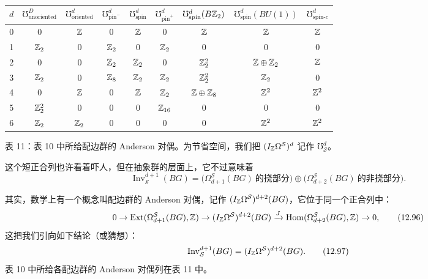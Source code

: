 \begin{center}
  \small
  \setlength{\tabcolsep}{4pt}
  \begin{tabular}{c||cc|ccc|ccc}
    \toprule
    $d$
    & $\mho^D_{\mathrm{unoriented}}$ & $\mho^d_{\mathrm{oriented}}$
    & $\mho^d_{\mathrm{pin}^-}$ & $\mho^d_{\mathrm{spin}}$ & $\mho^d_{\mathrm{pin}^+}$
    & $\mho^d_{\mathrm{spin}}(B\mathbb{Z}_2)$ & $\mho^d_{\mathrm{spin}}(BU(1))$
    & $\mho^d_{\mathrm{spin}\text{-}c}$ \\
    \midrule
    0 & $0$ & $\mathbb{Z}$ & $0$ & $\mathbb{Z}$ & $0$ & $\mathbb{Z}$ & $\mathbb{Z}$ & $\mathbb{Z}$ \\
    1 & $\mathbb{Z}_2$ & $0$ & $\mathbb{Z}_2$ & $0$ & $\mathbb{Z}_2$ & $0$ & $0$ & $0$ \\
    2 & $0$ & $0$ & $\mathbb{Z}_2$ & $\mathbb{Z}_2$ & $0$ & $\mathbb{Z}_2^2$ & $\mathbb{Z}\oplus\mathbb{Z}_2$ & $\mathbb{Z}$ \\
    3 & $\mathbb{Z}_2$ & $0$ & $\mathbb{Z}_8$ & $\mathbb{Z}_2$ & $\mathbb{Z}_2$ & $\mathbb{Z}_2^2$ & $\mathbb{Z}_2$ & $0$ \\
    4 & $0$ & $\mathbb{Z}$ & $0$ & $\mathbb{Z}$ & $\mathbb{Z}_2$ & $\mathbb{Z}\oplus\mathbb{Z}_8$ & $\mathbb{Z}^2$ & $\mathbb{Z}^2$ \\
    5 & $\mathbb{Z}_2^2$ & $0$ & $0$ & $0$ & $\mathbb{Z}_{16}$ & $0$ & $0$ & $0$ \\
    6 & $\mathbb{Z}_2$ & $\mathbb{Z}_2$ & $0$ & $0$ & $0$ & $0$ & $\mathbb{Z}^2$ & $\mathbb{Z}^2$ \\
    \bottomrule
  \end{tabular}

  \smallskip
  {\small 表 11：表 10 中所给配边群的 Anderson 对偶。为节省空间，我们把 $(I_{\mathbb{Z}}\Omega^{\mathcal S})^d$ 记作 $\mho^d_{\mathcal S}$。\par}
\end{center}

这个短正合列也许看着吓人，但在抽象群的层面上，它不过意味着
\begin{equation}
  \operatorname{Inv}^{d+1}_{\mathcal S}(BG)
  =\bigl(\Omega^{\mathcal S}_{d+1}(BG)\ \text{的挠部分}\bigr)
  \oplus\bigl(\Omega^{\mathcal S}_{d+2}(BG)\ \text{的非挠部分}\bigr).
  \tag{12.95}
\end{equation}

其实，数学上有一个概念叫配边群的 Anderson 对偶，记作 $(I_{\mathbb{Z}}\Omega^{\mathcal S})^{d+2}(BG)$，它位于同一个正合列中：
\begin{equation}
  0\to\operatorname{Ext}(\Omega^{\mathcal S}_{d+1}(BG),\mathbb{Z})
  \to(I_{\mathbb{Z}}\Omega^{\mathcal S})^{d+2}(BG)
  \xrightarrow{J}\operatorname{Hom}(\Omega^{\mathcal S}_{d+2}(BG),\mathbb{Z})\to0,
  \tag{12.96}
\end{equation}
这把我们引向如下结论（或猜想）：
\begin{equation}
  \operatorname{Inv}^{d+1}_{\mathcal S}(BG)=(I_{\mathbb{Z}}\Omega^{\mathcal S})^{d+2}(BG).
  \tag{12.97}
\end{equation}
表 10 中所给各配边群的 Anderson 对偶列在表 11 中。

